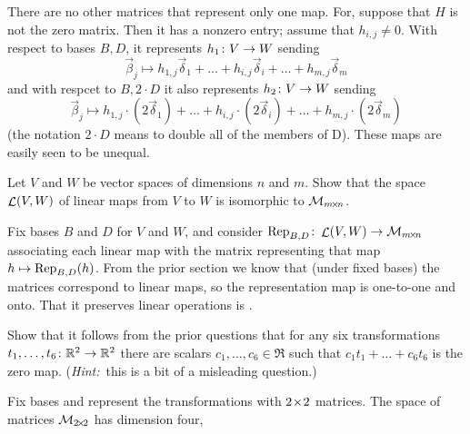 \begin{exercises}
\begin{answer}
      There are no other matrices that represent only one map.
      For, suppose that \( H \) is 
      not the zero matrix.
      Then it has a nonzero entry; assume that \( h_{i,j}\neq 0 \).
      With respect to bases $B,D$, it represents \( \map{h_1}{V}{W} \) 
      sending
      \begin{equation*}
        \vec{\beta}_j\mapsto
        h_{1,j}\vec{\delta}_1+\dots+h_{i,j}\vec{\delta}_i
          +\dots+h_{m,j}\vec{\delta}_m
      \end{equation*}
      and with respcet to $B,2\cdot D$ it also represents 
      \( \map{h_2}{V}{W} \) sending
      \begin{equation*}
        \vec{\beta}_j\mapsto
        h_{1,j}\cdot(2\vec{\delta}_1)+\dots+h_{i,j}\cdot(2\vec{\delta}_i)
          +\dots+h_{m,j}\cdot(2\vec{\delta}_m)
      \end{equation*}
      (the notation $2\cdot D$ means to double 
      all of the members of D). 
      These maps are easily seen to be unequal. 
     \end{answer}
  \recommended \item \label{exer:LinMapsIsoMatSp}
    Let \( V \) and \( W \) be vector spaces of dimensions \( n \) and \( m \).
    Show that the space \( \linmaps{V}{W} \) of linear maps from \( V \) to
    \( W \) is isomorphic to \( \matspace_{\nbym{m}{n}} \).
    \begin{answer}
      Fix bases \( B \) and \( D \) for \( V \) and \( W \), and consider  
      \( \map{\mbox{Rep}_{B,D}}{\linmaps{V}{W}}{\matspace_{\nbym{m}{n}}} \)
      associating each linear map with the matrix representing that map
      $h\mapsto \rep{h}{B,D}$.
      From the prior section we know that (under fixed bases) 
      the matrices correspond to linear maps, 
      so the representation map is one-to-one and onto.
      That it preserves linear operations is     
      .
    \end{answer}
  \recommended \item 
    Show that it follows from the prior questions that
    for any six transformations
    \( \map{t_1,\dots,t_6}{\Re^2}{\Re^2} \)
    there are scalars \( c_1,\dots,c_6\in\Re \) such that
    \( c_1t_1+\dots+c_6t_6 \) is the zero map.
    (\textit{Hint:}~this is a bit of a misleading question.)
    \begin{answer}
      Fix bases and represent the transformations with
      \( \nbyn{2} \) matrices.
      The space of matrices \( \matspace_{\nbyn{2}} \) has dimension four,

\end{answer}
\end{exercises}
